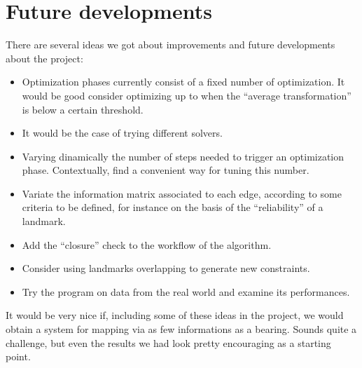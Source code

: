 \section{Future developments}
There are several ideas we got about improvements and future developments about the project:
\begin{itemize}
  \item Optimization phases currently consist of a fixed number of optimization. It would be good consider optimizing up to when the ``average transformation'' is below a certain threshold.
  \item It would be the case of trying different solvers.
  \item Varying dinamically the number of steps needed to trigger an optimization phase. Contextually, find a convenient way for tuning this number.
  \item Variate the information matrix associated to each edge, according to some criteria to be defined, for instance on the basis of the ``reliability'' of a landmark.
  \item Add the ``closure'' check to the workflow of the algorithm.
  \item Consider using landmarks overlapping to generate new constraints.
  \item Try the program on data from the real world and examine its performances.
\end{itemize}

It would be very nice if, including some of these ideas in the project, we would obtain a system for mapping via as few informations as a bearing. Sounds quite a challenge, but even the results we had look pretty encouraging as a starting point.
